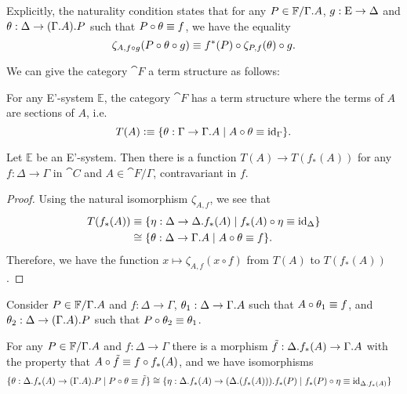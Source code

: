 \begin{rmk}
Explicitly, the
naturality condition states that for any $P\in\cat{F}/\ctxext{\Gamma}{A}$,
$g:\mathrm{E}\to\Delta$ and $\theta:\Delta\to\ctxext{{\Gamma}{A}}{P}$ such that
$P\circ\theta\equiv f$, we have the equality
\begin{equation*}
\zeta_{A,f\circ g}(P\circ\theta\circ g)\equiv f^\ast(P)\circ\zeta_{P,f}(\theta)\circ g.
\end{equation*}
\end{rmk}

We can give the category $\cat{F}$ a term structure as follows:

\begin{defn}
For any E'-system $\mathbb{E}$, the category $\cat{F}$ has a term structure
where the terms of $A$ are sections of $A$, i.e.
\begin{equation*}
T(A)\defeq\{\theta:\Gamma\to\ctxext{\Gamma}{A}\mid A\circ\theta\jdeq\catid{\Gamma}\}.
\end{equation*}
\end{defn}

\begin{lem}
Let $\mathbb{E}$ be an E'-system. Then there is a function $T(A)\to T(f_\ast(A))$
for any $f:\Delta\to\Gamma$ in $\cat{C}$ and $A\in\cat{F}/\Gamma$, contravariant
in $f$. 
\end{lem}

\begin{proof}
Using the natural isomorphism $\zeta_{A,f}$, we see that
\begin{align*}
T(f_\ast(A)) & \jdeq \{\eta : \Delta\to\ctxext{\Delta}{f_\ast(A)}\mid f_\ast(A)\circ\eta\jdeq\catid{\Delta}\}
  \\
  & \cong
\{\theta : \Delta\to \ctxext{\Gamma}{A}\mid A\circ\theta\jdeq f\}.
\end{align*}
Therefore, we have the function $x\mapsto \zeta_{A,f}(x\circ f)$ from $T(A)$ to
$T(f_\ast(A))$. 
\end{proof}

\begin{defn}
Consider $P\in\cat{F}/\ctxext{\Gamma}{A}$ and $f:\Delta\to\Gamma$,
$\theta_1:\Delta\to\ctxext{\Gamma}{A}$ such that $A\circ\theta_1\equiv f$, 
and $\theta_2:\Delta\to\ctxext{{\Gamma}{A}}{P}$ such that $P\circ\theta_2\equiv\theta_1$.  
\end{defn}

\begin{defn}
For any $P\in\cat{F}/\ctxext{\Gamma}{A}$ and $f:\Delta\to\Gamma$ 
there is a morphism $\tilde{f}:\ctxext{\Delta}{f_\ast(A)}\to\ctxext{\Gamma}{A}$
with the property that $A\circ\tilde{f}\equiv f\circ f_\ast(A)$, and
we have isomorphisms
\begin{align*}
\{\theta:\ctxext{\Delta}{f_\ast(A)}\to\ctxext{{\Gamma}{A}}{P}\mid P\circ\theta\jdeq \tilde{f}\}
&  \cong
\{\eta:\ctxext{\Delta}{f_\ast(A)}\to\ctxext{{\Delta}{(f_\ast(A))}}{f_\ast(P)}\mid f_\ast(P)\circ\eta\jdeq\catid{\ctxext{\Delta}{f_\ast(A)}}\}
\end{align*}
\end{defn}

